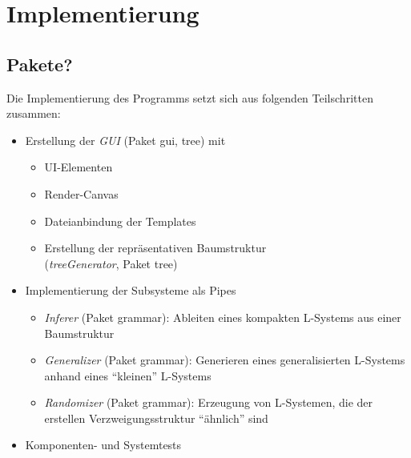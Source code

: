 
\chapter{Implementierung}

\section{Pakete?}

Die Implementierung des Programms setzt sich aus folgenden Teilschritten zusammen:
\begin{itemize}
    \item Erstellung der \textit{GUI} (Paket gui, tree) mit
    \begin{itemize}
        \item UI-Elementen
        \item Render-Canvas
        \item Dateianbindung der Templates
        \item Erstellung der repräsentativen Baumstruktur\\ (\textit{treeGenerator}, Paket tree)
    \end{itemize}
    \item Implementierung der Subsysteme als Pipes
    \begin{itemize}
        \item \textit{Inferer} (Paket grammar): Ableiten eines kompakten L-Systems aus einer Baumstruktur
        \item \textit{Generalizer} (Paket grammar): Generieren eines generalisierten L-Systems anhand eines
        "`kleinen"' L-Systems
        \item \textit{Randomizer} (Paket grammar): Erzeugung von L-Systemen, die der erstellen
        Verzweigungsstruktur "`ähnlich"' sind
    \end{itemize}
    \item Komponenten- und Systemtests
\end{itemize}
